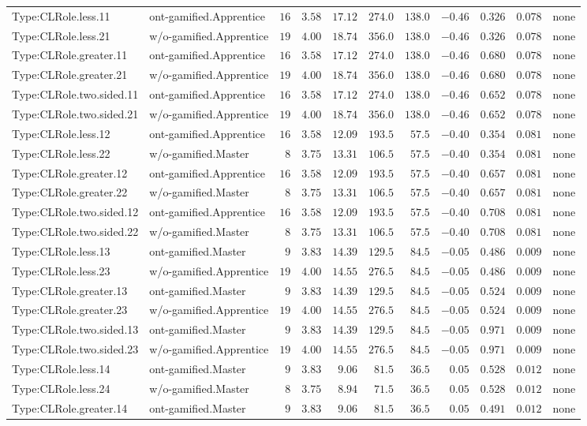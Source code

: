 \documentclass[6pt,a4paper]{article}
\begin{document}
{\begin{longtable}{llrrrrrrrrl}
Type:CLRole.less.11&ont-gamified.Apprentice&$16$&$3.58$&$17.12$&$274.0$&$138.0$&$-0.46$&$0.326$&$0.078$&none\tabularnewline
Type:CLRole.less.21&w/o-gamified.Apprentice&$19$&$4.00$&$18.74$&$356.0$&$138.0$&$-0.46$&$0.326$&$0.078$&none\tabularnewline
Type:CLRole.greater.11&ont-gamified.Apprentice&$16$&$3.58$&$17.12$&$274.0$&$138.0$&$-0.46$&$0.680$&$0.078$&none\tabularnewline
Type:CLRole.greater.21&w/o-gamified.Apprentice&$19$&$4.00$&$18.74$&$356.0$&$138.0$&$-0.46$&$0.680$&$0.078$&none\tabularnewline
Type:CLRole.two.sided.11&ont-gamified.Apprentice&$16$&$3.58$&$17.12$&$274.0$&$138.0$&$-0.46$&$0.652$&$0.078$&none\tabularnewline
Type:CLRole.two.sided.21&w/o-gamified.Apprentice&$19$&$4.00$&$18.74$&$356.0$&$138.0$&$-0.46$&$0.652$&$0.078$&none\tabularnewline
Type:CLRole.less.12&ont-gamified.Apprentice&$16$&$3.58$&$12.09$&$193.5$&$ 57.5$&$-0.40$&$0.354$&$0.081$&none\tabularnewline
Type:CLRole.less.22&w/o-gamified.Master&$ 8$&$3.75$&$13.31$&$106.5$&$ 57.5$&$-0.40$&$0.354$&$0.081$&none\tabularnewline
Type:CLRole.greater.12&ont-gamified.Apprentice&$16$&$3.58$&$12.09$&$193.5$&$ 57.5$&$-0.40$&$0.657$&$0.081$&none\tabularnewline
Type:CLRole.greater.22&w/o-gamified.Master&$ 8$&$3.75$&$13.31$&$106.5$&$ 57.5$&$-0.40$&$0.657$&$0.081$&none\tabularnewline
Type:CLRole.two.sided.12&ont-gamified.Apprentice&$16$&$3.58$&$12.09$&$193.5$&$ 57.5$&$-0.40$&$0.708$&$0.081$&none\tabularnewline
Type:CLRole.two.sided.22&w/o-gamified.Master&$ 8$&$3.75$&$13.31$&$106.5$&$ 57.5$&$-0.40$&$0.708$&$0.081$&none\tabularnewline
Type:CLRole.less.13&ont-gamified.Master&$ 9$&$3.83$&$14.39$&$129.5$&$ 84.5$&$-0.05$&$0.486$&$0.009$&none\tabularnewline
Type:CLRole.less.23&w/o-gamified.Apprentice&$19$&$4.00$&$14.55$&$276.5$&$ 84.5$&$-0.05$&$0.486$&$0.009$&none\tabularnewline
Type:CLRole.greater.13&ont-gamified.Master&$ 9$&$3.83$&$14.39$&$129.5$&$ 84.5$&$-0.05$&$0.524$&$0.009$&none\tabularnewline
Type:CLRole.greater.23&w/o-gamified.Apprentice&$19$&$4.00$&$14.55$&$276.5$&$ 84.5$&$-0.05$&$0.524$&$0.009$&none\tabularnewline
Type:CLRole.two.sided.13&ont-gamified.Master&$ 9$&$3.83$&$14.39$&$129.5$&$ 84.5$&$-0.05$&$0.971$&$0.009$&none\tabularnewline
Type:CLRole.two.sided.23&w/o-gamified.Apprentice&$19$&$4.00$&$14.55$&$276.5$&$ 84.5$&$-0.05$&$0.971$&$0.009$&none\tabularnewline
Type:CLRole.less.14&ont-gamified.Master&$ 9$&$3.83$&$ 9.06$&$ 81.5$&$ 36.5$&$ 0.05$&$0.528$&$0.012$&none\tabularnewline
Type:CLRole.less.24&w/o-gamified.Master&$ 8$&$3.75$&$ 8.94$&$ 71.5$&$ 36.5$&$ 0.05$&$0.528$&$0.012$&none\tabularnewline
Type:CLRole.greater.14&ont-gamified.Master&$ 9$&$3.83$&$ 9.06$&$ 81.5$&$ 36.5$&$ 0.05$&$0.491$&$0.012$&none\tabularnewline

\end{longtable}}
\end{document}
